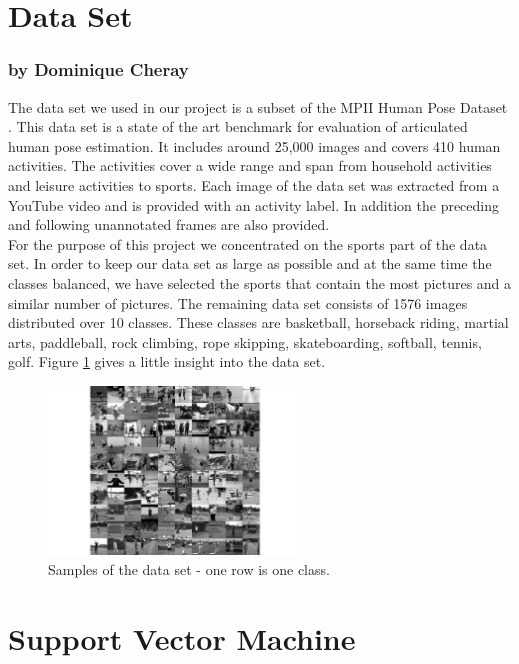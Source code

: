 \documentclass[11pt]{report}
\begin{document}
\section{Data Set}
\label{dataset}
\subsubsection{by Dominique Cheray}
The data set we used in our project is a subset of the MPII Human Pose Dataset
\cite{andriluka20142d}. This data set is a state of the art benchmark for
evaluation of articulated human pose estimation. It includes around
25,000 images and covers 410 human activities. The activities cover a wide range
and span from household activities and leisure activities to sports. Each image
of the data set was extracted from a YouTube video and is provided with an
activity label. In addition the preceding and following unannotated frames are
also provided. \\
For the purpose of this project we concentrated on the sports part of the
data set. In order to keep our data set as large as possible and at the same
time the classes balanced, we have selected the sports that contain the most
pictures and a similar number of pictures. The remaining data set consists of
1576 images distributed over 10 classes. These classes are basketball, horseback
riding, martial arts, paddleball, rock climbing, rope skipping, skateboarding,
softball, tennis, golf. Figure \ref{plotgrid} gives a little insight into the
data set. 
\begin{figure}
  \centering
  \includegraphics[width=0.6\textwidth]{plotgrid}
  \caption{Samples of the data set - one row is one class.}
  \label{plotgrid}
\end{figure}

\section {Support Vector Machine}
\label{SVM}
\end{document}
